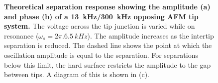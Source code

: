 \documentclass{article}
\begin{document}
\begin{figure}[bt]
\centering
{}
{\caption[Theoretical separation response showing the amplitude (a) and phase (b) of a \SI{13}{kHz}/\SI{300}{kHz} opposing AFM tip system]{\textbf{Theoretical separation response showing the amplitude (a) and phase (b) of a \SI{13}{kHz}/\SI{300}{kHz} opposing AFM tip system.} The voltage across the tip junction is varied while on resonance ($\omega_s = 2\pi.\SI{6.5}{kHz}$). The amplitude increases as the intertip separation is reduced. The dashed line shows the point at which the oscillation amplitude is equal to the separation. For separations below this limit, the hard surface restricts the amplitude to the gap between tips. A diagram of this is shown in (c).}
\label{fig:num_sep_resp}}
\end{figure}
\end{document}
